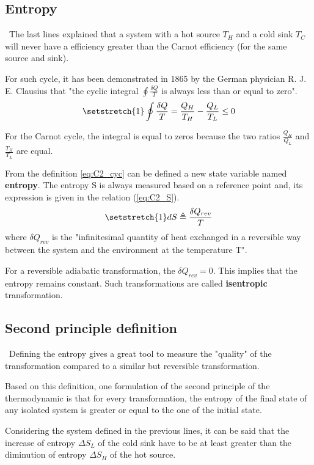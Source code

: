 \subsection{Entropy}
\quad\, The last lines explained that a system with a hot source $T_H$ and a cold sink $T_C$ will never have a efficiency greater than the Carnot efficiency (for the same source and sink).

For such cycle, it has been demonstrated in 1865 by the German physician R. J. E. Clausius that "the cyclic integral $\oint\frac{\delta Q}{T}$ is always less than or equal to zero"\cite{2015}.
\begin{equation}
\setstretch{1}
\oint\frac{\delta Q}{T} = \frac{Q_H}{T_H} - \frac{Q_L}{T_L}\leq 0\label{eq:C2_cyc}
\end{equation}

For the Carnot cycle, the integral is equal to zeros because the two ratios $\frac{Q_H}{Q_L}$ and $\frac{T_H}{T_L}$ are equal.

From the definition \ref{eq:C2_cyc} can be defined a new state variable named \textbf{entropy}. The entropy S is always measured based on a reference point and, its expression is given in the relation (\ref{eq:C2_S}).
\begin{equation}
\setstretch{1}
dS \triangleq \frac{\delta Q_{rev}}{T}\label{eq:C2_S}
\end{equation}
where $\delta Q_{rev}$ is the "infinitesimal quantity of heat exchanged in a reversible way between the system and the environment at the temperature T"\cite{Dewallef2019}. 

For a reversible adiabatic transformation, the $\delta Q_{rev}=0$. This implies that the entropy remains constant. Such transformations are called \textbf{isentropic} transformation.
\subsection{Second principle definition}
\quad\, Defining the entropy gives a great tool to measure the "quality" of the transformation compared to a similar but reversible transformation.

Based on this definition, one formulation of the second principle of the thermodynamic is that for every transformation, the entropy of the final state of any isolated system is greater or equal to the one of the initial state.

Considering the system defined in the previous lines, it can be said that the increase of entropy $\Delta S_L$ of the cold sink have to be at least greater than the diminution of entropy $\Delta S_H$ of the hot source.

